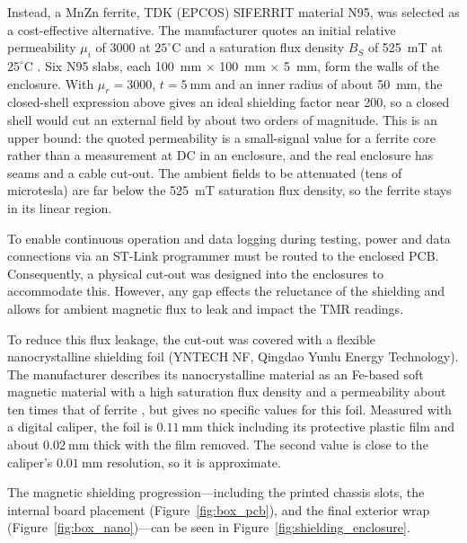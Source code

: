\documentclass[12pt,a4paper]{article}
\begin{document}
Instead, a MnZn ferrite, TDK (EPCOS) SIFERRIT material N95, was selected as a cost-effective alternative. The manufacturer quotes an initial relative permeability $\mu_i$ of 3000 at $25^{\circ}\text{C}$ and a saturation flux density $B_S$ of \SI{525}{\milli\tesla} at $25^{\circ}\text{C}$ \cite{tdk_n95}. Six N95 slabs, each \SI{100}{\milli\metre} $\times$ \SI{100}{\milli\metre} $\times$ \SI{5}{\milli\metre}, form the walls of the enclosure. With $\mu_r = 3000$, $t = \SI{5}{\milli\metre}$ and an inner radius of about \SI{50}{\milli\metre}, the closed-shell expression above gives an ideal shielding factor near 200, so a closed shell would cut an external field by about two orders of magnitude. This is an upper bound: the quoted permeability is a small-signal value for a ferrite core rather than a measurement at DC in an enclosure, and the real enclosure has seams and a cable cut-out. The ambient fields to be attenuated (tens of microtesla) are far below the \SI{525}{\milli\tesla} saturation flux density, so the ferrite stays in its linear region.

To enable continuous operation and data logging during testing, power and data connections via an ST-Link programmer must be routed to the enclosed PCB. Consequently, a physical cut-out was designed into the enclosures to accommodate this. However, any gap effects the reluctance of the shielding and allows for ambient magnetic flux to leak and impact the TMR readings.

To reduce this flux leakage, the cut-out was covered with a flexible nanocrystalline shielding foil (YNTECH NF, Qingdao Yunlu Energy Technology). The manufacturer describes its nanocrystalline material as an Fe-based soft magnetic material with a high saturation flux density and a permeability about ten times that of ferrite \cite{yunlu_nanocrystalline}, but gives no specific values for this foil. Measured with a digital caliper, the foil is $\SI{0.11}{\milli\metre}$ thick including its protective plastic film and about $\SI{0.02}{\milli\metre}$ thick with the film removed. The second value is close to the caliper's $\SI{0.01}{\milli\metre}$ resolution, so it is approximate.

The magnetic shielding progression—including the printed chassis slots, the internal board placement (Figure~\ref{fig:box_pcb}), and the final exterior wrap (Figure~\ref{fig:box_nano})—can be seen in Figure~\ref{fig:shielding_enclosure}.
\end{document}
